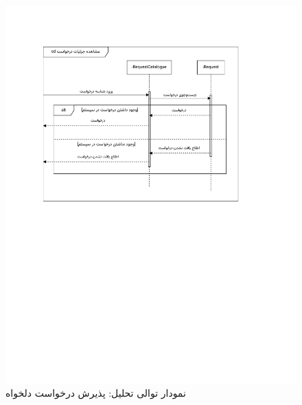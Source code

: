 \begin{figure}[ht!]
	\centering
	\includegraphics[scale=0.8, page=4]{figs/OOD-Sequence-2.pdf}
	\caption{نمودار توالی تحلیل: پذیرش درخواست دلخواه}
\end{figure}
\FloatBarrier
\newpage


